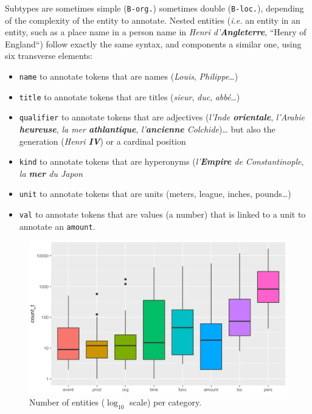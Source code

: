 \noindent Subtypes are sometimes simple (\texttt{B-org.}) sometimes double (\texttt{B-loc.}), depending of the complexity of the entity to annotate. Nested entities (\textit{i.e.} an entity in an entity, such as a place name in a person name in \textit{Henri d'\textbf{Angleterre}}, ``Henry of England``) follow exactly the same syntax, and components a similar one, using six transverse elements:

\begin{itemize}
    \item \texttt{name} to annotate tokens that are names (\textit{Louis}, \textit{Philippe}\dots)
    \item \texttt{title}  to annotate tokens that are titles (\textit{sieur}, \textit{duc}, \textit{abbé}\dots)
    \item \texttt{qualifier} to annotate tokens that are adjectives (\textit{l'Inde \textbf{orientale}}, \textit{l'Arabie \textbf{heureuse}}, \textit{la mer \textbf{athlantique}}, \textit{l'\textbf{ancienne} Colchide})… but also the generation (\textit{Henri \textbf{IV}}) or a cardinal position
    \item \texttt{kind} to annotate tokens that are hyperonyms (\textit{l'\textbf{Empire} de Constantinople}, \textit{la \textbf{mer} du Japon}
    \item \texttt{unit} to annotate tokens that are units (meters, league, inches, pounds…)
    \item \texttt{val} to annotate tokens that are values (a number) that is linked to a unit to annotate an \texttt{amount}.
\end{itemize}

\begin{figure}[!htp]
    \centering
    \includegraphics[width=0.75\linewidth]{static/media/mod_eval/dalembert/corpus_desc_1.png}
    \caption{Number of entities (\textit{$\log_{10}$} scale) per category.}
    \label{fig:repartition}
\end{figure}

